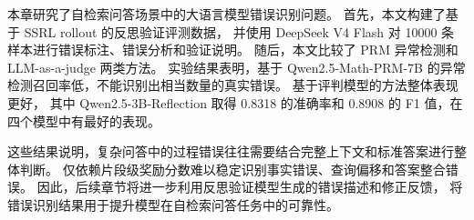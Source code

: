 本章研究了自检索问答场景中的大语言模型错误识别问题。
首先，本文构建了基于 SSRL rollout 的反思验证评测数据，
并使用 DeepSeek V4 Flash 对 10000 条样本进行错误标注、错误分析和验证说明。
随后，本文比较了 PRM 异常检测和 LLM-as-a-judge 两类方法。
实验结果表明，基于 Qwen2.5-Math-PRM-7B 的异常检测召回率低，不能识别出相当数量的真实错误。
基于评判模型的方法整体表现更好，
其中 Qwen2.5-3B-Reflection 取得 0.8318 的准确率和 0.8908 的 F1 值，在四个模型中有最好的表现。

这些结果说明，复杂问答中的过程错误往往需要结合完整上下文和标准答案进行整体判断。
仅依赖片段级奖励分数难以稳定识别事实错误、查询偏移和答案整合错误。
因此，后续章节将进一步利用反思验证模型生成的错误描述和修正反馈，
将错误识别结果用于提升模型在自检索问答任务中的可靠性。

